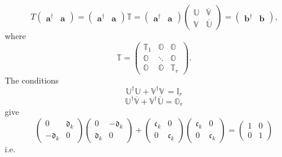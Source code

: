 \documentclass[aps, preprint]{revtex4}
\begin{document}
\begin{equation}T \left (\begin{array}{cc}\mathbf{a}^{ \dag } & \mathbf{a}\end{array}\right ) =\left (\begin{array}{cc}\mathbf{a}^{ \dag } & \mathbf{a}\end{array}\right ) \mathbb{T} =\left (\begin{array}{cc}\mathbf{a}^{ \dag } & \mathbf{a}\end{array}\right ) \left (\begin{array}{cc}\mathbb{U} & \overline{\mathbb{V}} \\
\mathbb{V} & \overline{\mathbb{U}}\end{array}\right ) =\left (\begin{array}{cc}\mathbf{b}^{ \dag } & \mathbf{b}\end{array}\right )\text{,}
\end{equation}where
\begin{equation*}\mathbb{T} =\left (\begin{array}{ccc}\mathbb{T}_{1} & \mathbb{O} & \mathbb{O} \\
\mathbb{O} & \ddots  & \mathbb{O} \\
\mathbb{O} & \mathbb{O} & \mathbb{T}_{r}\end{array}\right )\text{.}
\end{equation*}The conditions
\begin{equation}\mathbb{U}^{ \dag } \mathbb{U} +\mathbb{V}^{ \dag } \mathbb{V}\, =\mathbb{I}_{r}
\end{equation}
\begin{equation}\mathbb{U}^{ \dag } \overline{\mathbb{V}} +\mathbb{V}^{ \dag } \overline{\mathbb{U}} =\mathbb{O}_{r}
\end{equation}give
\begin{equation*}\left (\begin{array}{cc}0 & \mathfrak{d}_{k} \\
 -\mathfrak{d}_{k} & 0\end{array}\right ) \left (\begin{array}{cc}0 &  -\mathfrak{d}_{k} \\
\mathfrak{d}_{k} & 0\end{array}\right ) +\left (\begin{array}{cc}\mathfrak{c}_{k} & 0 \\
0 & \mathfrak{c}_{k}\end{array}\right ) \left (\begin{array}{cc}\mathfrak{c}_{k} & 0 \\
0 & \mathfrak{c}_{k}\end{array}\right ) =\left (\begin{array}{cc}1 & 0 \\
0 & 1\end{array}\right )
\end{equation*}i.e.
\end{document}
